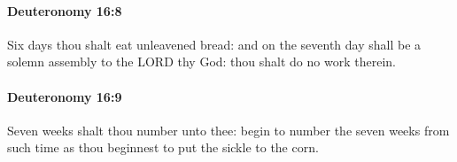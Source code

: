 		\paragraph{Deuteronomy 16:8} %
			\label{DEUTERONOMY-16-8}

			Six days thou shalt eat unleavened bread: and on the seventh day shall be a solemn assembly to the LORD thy God: thou shalt do no work therein.


		\paragraph{Deuteronomy 16:9} %
			\label{DEUTERONOMY-16-9}

			Seven weeks shalt thou number unto thee: begin to number the seven weeks from such time as thou beginnest to put the sickle to the corn.



